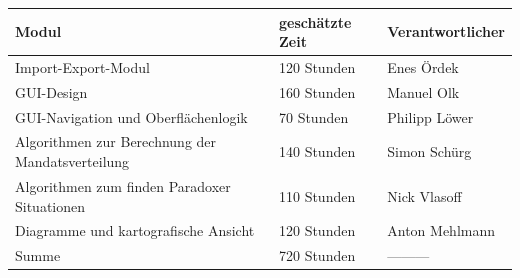 \documentclass[10pt,a4paper]{article}
\begin{document}
\begin{tabular}[h]{lll}
	\hline
	\textbf{Modul} & \textbf{geschätzte Zeit} & \textbf{Verantwortlicher} \\
	\hline
	Import-Export-Modul & 120 Stunden & Enes Ördek\\
	GUI-Design & 160 Stunden & Manuel Olk \\
	GUI-Navigation und Oberflächenlogik & 70 Stunden &  Philipp Löwer\\
	Algorithmen zur Berechnung der Mandatsverteilung & 140 Stunden &  Simon Schürg\\
	Algorithmen zum finden Paradoxer Situationen  & 110 Stunden &  Nick Vlasoff\\
	Diagramme und kartografische Ansicht  & 120 Stunden &  Anton Mehlmann\\
	\hline
	Summe & 720 Stunden & --------- \\
	\hline
\end{tabular}
\end{document}
